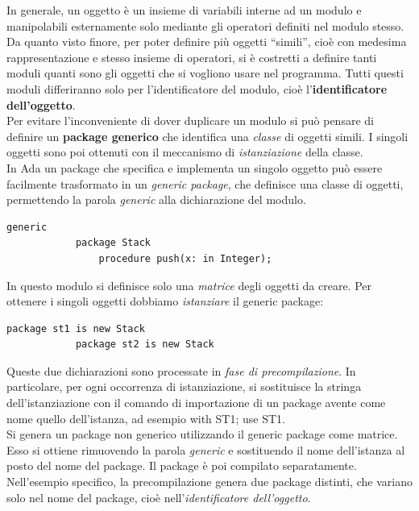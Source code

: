 \documentclass[12pt]{report}
\begin{document}
		In generale, un oggetto è un insieme di variabili interne ad un modulo e manipolabili esternamente solo mediante gli operatori definiti nel modulo stesso. Da quanto visto finore, per poter definire più oggetti ``simili'', cioè con medesima rappresentazione e stesso insieme di operatori, si è costretti a definire tanti moduli quanti sono gli oggetti che si vogliono usare nel programma. Tutti questi moduli differiranno solo per l'identificatore del modulo, cioè l'\textbf{identificatore dell'oggetto}. \\
		Per evitare l'inconveniente di dover duplicare un modulo si può pensare di definire un \textbf{package generico} che identifica una \textit{classe} di oggetti simili. I singoli oggetti sono poi ottenuti con il meccanismo di \textit{istanziazione} della classe. \\
		In Ada un package che specifica e implementa un singolo oggetto può essere facilmente trasformato in un \textit{generic package}, che definisce una classe di oggetti, permettendo la parola \textit{generic} alla dichiarazione del modulo.
		\begin{lstlisting}[style=adastyle]
			generic
			package Stack
				procedure push(x: in Integer);\end{lstlisting}
		In questo modulo si definisce solo una \textit{matrice} degli oggetti da creare. Per ottenere i singoli oggetti dobbiamo \textit{istanziare} il generic package:
		\begin{lstlisting}[style=adastyle]
			package st1 is new Stack
			package st2 is new Stack\end{lstlisting}
		Queste due dichiarazioni sono processate in \textit{fase di precompilazione}. In particolare, per ogni occorrenza di istanziazione, si sostituisce la stringa dell'istanziazione con il comando di importazione di un package avente come nome quello dell'istanza, ad esempio with ST1; use ST1. \\
		Si genera un package non generico utilizzando il generic package come matrice. Esso si ottiene rimuovendo la parola \textit{generic} e sostituendo il nome dell'istanza al posto del nome del package. Il package è poi compilato separatamente. \\
		Nell'esempio specifico, la precompilazione genera due package distinti, che variano solo nel nome del package, cioè nell'\textit{identificatore dell'oggetto}.
\end{document}
